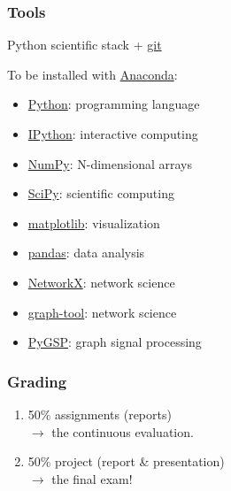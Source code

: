 \documentclass{beamer}
\begin{document}

\begin{frame}
	\frametitle{Tools}
	\begin{center}
		Python scientific stack + \href{https://git-scm.com}{git}
	\end{center}
	\vfill
	To be installed with \href{https://www.anaconda.com/download}{Anaconda}:
	\begin{itemize}
		\item \href{https://www.python.org}{Python}: programming language
		\item \href{https://ipython.org}{IPython}: interactive computing
		\item \href{http://www.numpy.org}{NumPy}: N-dimensional arrays
		\item \href{https://www.scipy.org/scipylib/index.html}{SciPy}: scientific computing
		\item \href{https://matplotlib.org}{matplotlib}: visualization
		\item \href{https://pandas.pydata.org}{pandas}: data analysis
		\item \href{https://networkx.github.io}{NetworkX}: network science
		\item \href{https://graph-tool.skewed.de}{graph-tool}: network science
		\item \href{https://github.com/epfl-lts2/pygsp}{PyGSP}: graph signal processing
	\end{itemize}
\end{frame}


\begin{frame}
	\frametitle{Grading}
	\begin{enumerate}
		\item 50\% assignments (reports) \\
		$\rightarrow$ the continuous evaluation.
		\vspace{2em}
		\item 50\% project (report \& presentation) \\
		$\rightarrow$ the final exam!
	\end{enumerate}
\end{frame}

\end{document}
